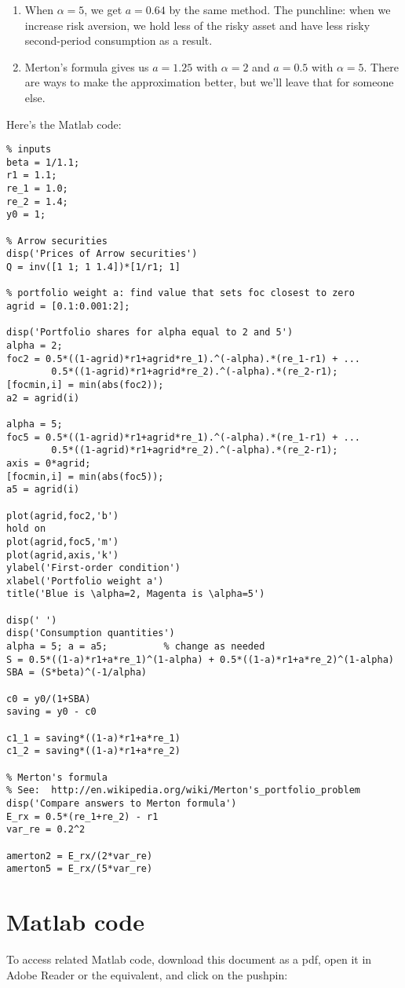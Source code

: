 \documentclass[11pt]{article}
\begin{document}
\begin{enumerate}
\begin{enumerate}
\item When $\alpha=5$, we get $a=0.64$ by the same method.
The punchline:  when we increase risk aversion, we hold less of the risky asset
and have less risky second-period consumption as a result.

\item Merton's formula gives us $a= 1.25$ with $\alpha = 2$
and $a = 0.5 $ with $\alpha = 5$.
There are ways to make the approximation better, but we'll leave that for someone else.
\end{enumerate}
%
Here's the Matlab code:
\begin{verbatim}
% inputs
beta = 1/1.1;
r1 = 1.1;
re_1 = 1.0;
re_2 = 1.4;
y0 = 1;

% Arrow securities
disp('Prices of Arrow securities')
Q = inv([1 1; 1 1.4])*[1/r1; 1]

% portfolio weight a: find value that sets foc closest to zero
agrid = [0.1:0.001:2];

disp('Portfolio shares for alpha equal to 2 and 5')
alpha = 2;
foc2 = 0.5*((1-agrid)*r1+agrid*re_1).^(-alpha).*(re_1-r1) + ...
        0.5*((1-agrid)*r1+agrid*re_2).^(-alpha).*(re_2-r1);
[focmin,i] = min(abs(foc2));
a2 = agrid(i)

alpha = 5;
foc5 = 0.5*((1-agrid)*r1+agrid*re_1).^(-alpha).*(re_1-r1) + ...
        0.5*((1-agrid)*r1+agrid*re_2).^(-alpha).*(re_2-r1);
axis = 0*agrid;
[focmin,i] = min(abs(foc5));
a5 = agrid(i)

plot(agrid,foc2,'b')
hold on
plot(agrid,foc5,'m')
plot(agrid,axis,'k')
ylabel('First-order condition')
xlabel('Portfolio weight a')
title('Blue is \alpha=2, Magenta is \alpha=5')

disp(' ')
disp('Consumption quantities')
alpha = 5; a = a5;          % change as needed
S = 0.5*((1-a)*r1+a*re_1)^(1-alpha) + 0.5*((1-a)*r1+a*re_2)^(1-alpha)
SBA = (S*beta)^(-1/alpha)

c0 = y0/(1+SBA)
saving = y0 - c0

c1_1 = saving*((1-a)*r1+a*re_1)
c1_2 = saving*((1-a)*r1+a*re_2)

% Merton's formula
% See:  http://en.wikipedia.org/wiki/Merton's_portfolio_problem
disp('Compare answers to Merton formula')
E_rx = 0.5*(re_1+re_2) - r1
var_re = 0.2^2

amerton2 = E_rx/(2*var_re)
amerton5 = E_rx/(5*var_re)
\end{verbatim}

\end{enumerate}


\section*{Matlab code}

To access related Matlab code, download this document as a pdf, open it in Adobe Reader or the equivalent, and click on the pushpin:



\end{document}
